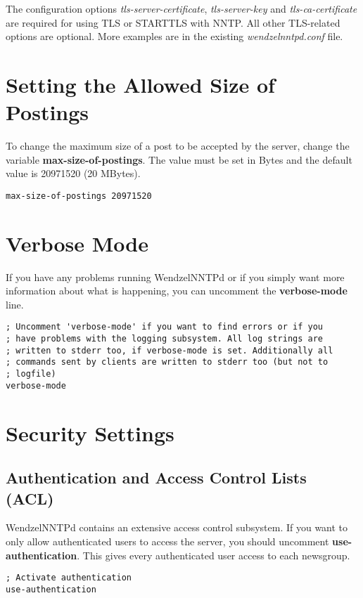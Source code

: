 The configuration options \textit{tls-server-certificate}, \textit{tls-server-key} and \textit{tls-ca-certificate} are required for using TLS or STARTTLS with NNTP. All other TLS-related options are optional. More examples are in the existing \textit{wendzelnntpd.conf} file.
\section{Setting the Allowed Size of Postings}

To change the maximum size of a post to be accepted by the server, change the variable \textbf{max-size-of-postings}. The value must be set in Bytes and the default value is 20971520 (20 MBytes).

\begin{verbatim}
max-size-of-postings 20971520
\end{verbatim}

\section{Verbose Mode}

If you have any problems running WendzelNNTPd or if you simply want more information about what is happening, you can uncomment the \textbf{verbose-mode} line.

\begin{verbatim}
; Uncomment 'verbose-mode' if you want to find errors or if you
; have problems with the logging subsystem. All log strings are
; written to stderr too, if verbose-mode is set. Additionally all
; commands sent by clients are written to stderr too (but not to
; logfile)
verbose-mode
\end{verbatim}

\section{Security Settings}

\subsection{Authentication and Access Control Lists (ACL)}

WendzelNNTPd contains an extensive access control subsystem. If you want to only allow authenticated users to access the server, you should uncomment \textbf{use-authentication}. This gives every authenticated user access to each newsgroup.

\begin{verbatim}
; Activate authentication
use-authentication
\end{verbatim}

